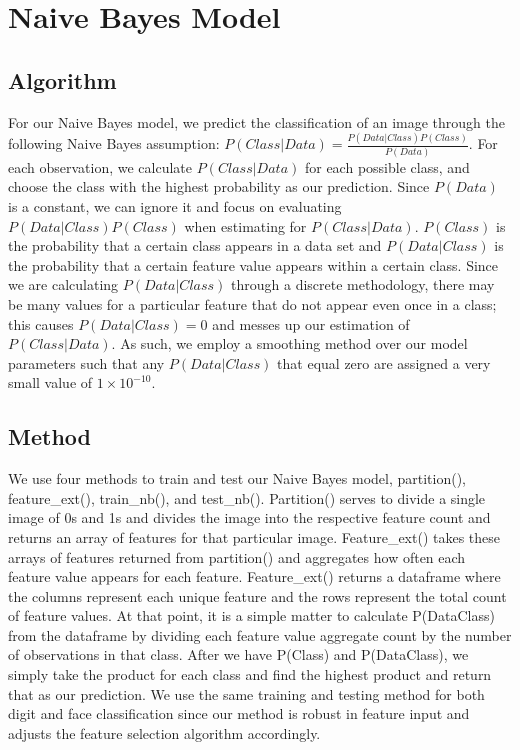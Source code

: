 \documentclass[10pt,parskip=half,
toc=sectionentrywithdots,
bibliography=totocnumbered,
captions=tableheading,numbers=noendperiod]{scrartcl}
\begin{document}
\hypertarget{naive-bayes-model}{%
\section{Naive Bayes Model}\label{naive-bayes-model}}

\hypertarget{algorithm}{%
\subsection{Algorithm}\label{algorithm}}

For our Naive Bayes model, we predict the classification of an image
through the following Naive Bayes assumption:
\(P(Class|Data) = \frac{P(Data|Class)P(Class)}{P(Data)}\). For each
observation, we calculate \(P(Class|Data)\) for each possible class, and
choose the class with the highest probability as our prediction. Since
\(P(Data)\) is a constant, we can ignore it and focus on evaluating
\(P(Data|Class)P(Class)\) when estimating for \(P(Class|Data)\).
\(P(Class)\) is the probability that a certain class appears in a data
set and \(P(Data|Class)\) is the probability that a certain feature
value appears within a certain class. Since we are calculating
\(P(Data|Class)\) through a discrete methodology, there may be many
values for a particular feature that do not appear even once in a class;
this causes \(P(Data|Class) = 0\) and messes up our estimation of
\(P(Class|Data)\). As such, we employ a smoothing method over our model
parameters such that any \(P(Data|Class)\) that equal zero are assigned
a very small value of \(1 \times 10^{-10}\).

\hypertarget{method}{%
\subsection{Method}\label{method}}

We use four methods to train and test our Naive Bayes model,
partition(), feature\_ext(), train\_nb(), and test\_nb(). Partition()
serves to divide a single image of 0s and 1s and divides the image into
the respective feature count and returns an array of features for that
particular image. Feature\_ext() takes these arrays of features returned
from partition() and aggregates how often each feature value appears for
each feature. Feature\_ext() returns a dataframe where the columns
represent each unique feature and the rows represent the total count of
feature values. At that point, it is a simple matter to calculate
P(Data\textbar{}Class) from the dataframe by dividing each feature value
aggregate count by the number of observations in that class. After we
have P(Class) and P(Data\textbar{}Class), we simply take the product for
each class and find the highest product and return that as our
prediction. We use the same training and testing method for both digit
and face classification since our method is robust in feature input and
adjusts the feature selection algorithm accordingly.
\end{document}
